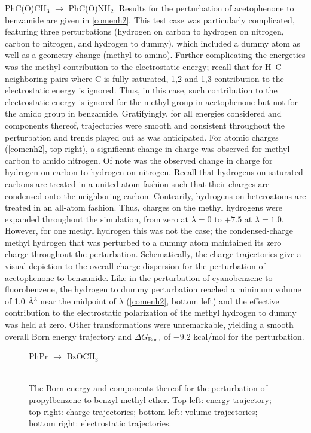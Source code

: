 \documentclass[12pt]{report}
\begin{document}
PhC(O)CH$_3$  $\longrightarrow$ PhC(O)NH$_2$. Results for the perturbation of acetophenone to benzamide are given in \cref{comenh2}. This test case was particularly complicated, featuring three perturbations (hydrogen on carbon to hydrogen on nitrogen, carbon to nitrogen, and hydrogen to dummy), which included a dummy atom as well as a geometry change (methyl to amino). Further complicating the energetics was the methyl contribution to the electrostatic energy; recall that for H--C neighboring pairs where C is fully saturated, 1,2 and 1,3 contribution to the electrostatic energy is ignored. Thus, in this case, such contribution to the electrostatic energy is ignored for the methyl group in acetophenone but not for the amido group in benzamide. Gratifyingly, for all energies considered and components thereof, trajectories were smooth and consistent throughout the perturbation and trends played out as was anticipated. For atomic charges (\cref{comenh2}, top right), a significant change in charge was observed for methyl carbon to amido nitrogen. Of note was the observed change in charge for hydrogen on carbon to hydrogen on nitrogen. Recall that hydrogens on saturated carbons are treated in a united-atom fashion such that their charges are condensed onto the neighboring carbon. Contrarily, hydrogens on heteroatoms are treated in an all-atom fashion. Thus, charges on the methyl hydrogens were expanded throughout the simulation, from zero at $\lambda = 0$ to $+7.5$ at $\lambda = 1.0$. However, for one methyl hydrogen this was not the case; the condensed-charge methyl hydrogen that was perturbed to a dummy atom maintained its zero charge throughout the perturbation. Schematically, the charge trajectories give a visual depiction to the overall charge dispersion for the perturbation of acetophenone to benzamide. Like in the perturbation of cyanobenzene to fluorobenzene, the hydrogen to dummy perturbation reached a minimum volume of 1.0 \AA$^{3}$ near the midpoint of $\lambda$ (\cref{comenh2}, bottom left) and the effective contribution to the electrostatic polarization of the methyl hydrogen to dummy was held at zero. Other transformations were unremarkable, yielding a smooth overall Born energy trajectory and $\Delta G_{ \textrm{Born}}$ of $-9.2$ kcal/mol for the perturbation.


\begin{figure}[t!]
\centering
PhPr $\longrightarrow$ BzOCH$_3$\\
\hspace*{-1.3cm}\\
\hspace*{-1.3cm}
\caption{The Born energy and components thereof for the perturbation of propylbenzene to benzyl methyl ether. Top left: energy trajectory; top right: charge trajectories; bottom left: volume trajectories; bottom right: electrostatic trajectories.}
\label{prmom}
\end{figure}
\end{document}
